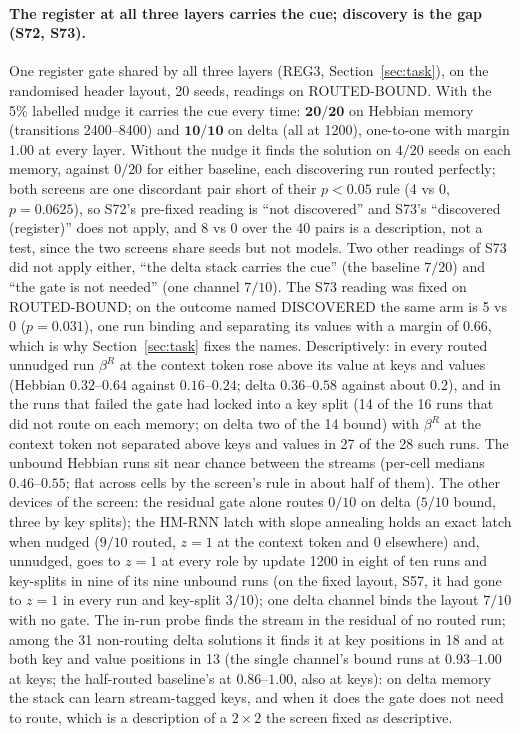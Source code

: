 \documentclass[11pt]{article}
\begin{document}
\paragraph{The register at all three layers carries the cue; discovery is the gap (S72, S73).} One register gate shared by all three layers (REG3, Section~\ref{sec:task}), on the randomised header layout, 20 seeds, readings on ROUTED-BOUND. With the 5\% labelled nudge it carries the cue every time: $\mathbf{20/20}$ on Hebbian memory (transitions 2400--8400) and $\mathbf{10/10}$ on delta (all at 1200), one-to-one with margin $1.00$ at every layer. Without the nudge it finds the solution on $4/20$ seeds on each memory, against $0/20$ for either baseline, each discovering run routed perfectly; both screens are one discordant pair short of their $p < 0.05$ rule (4 vs 0, $p = 0.0625$), so S72's pre-fixed reading is ``not discovered'' and S73's ``discovered (register)'' does not apply, and 8 vs 0 over the 40 pairs is a description, not a test, since the two screens share seeds but not models. Two other readings of S73 did not apply either, ``the delta stack carries the cue'' (the baseline $7/20$) and ``the gate is not needed'' (one channel $7/10$). The S73 reading was fixed on ROUTED-BOUND; on the outcome named DISCOVERED the same arm is 5 vs 0 ($p = 0.031$), one run binding and separating its values with a margin of $0.66$, which is why Section~\ref{sec:task} fixes the names. Descriptively: in every routed unnudged run $\beta^R$ at the context token rose above its value at keys and values (Hebbian $0.32$--$0.64$ against $0.16$--$0.24$; delta $0.36$--$0.58$ against about $0.2$), and in the runs that failed the gate had locked into a key split (14 of the 16 runs that did not route on each memory; on delta two of the 14 bound) with $\beta^R$ at the context token not separated above keys and values in 27 of the 28 such runs. The unbound Hebbian runs sit near chance between the streams (per-cell medians $0.46$--$0.55$; flat across cells by the screen's rule in about half of them). The other devices of the screen: the residual gate alone routes $0/10$ on delta ($5/10$ bound, three by key splits); the HM-RNN latch with slope annealing holds an exact latch when nudged ($9/10$ routed, $z = 1$ at the context token and $0$ elsewhere) and, unnudged, goes to $z = 1$ at every role by update 1200 in eight of ten runs and key-splits in nine of its nine unbound runs (on the fixed layout, S57, it had gone to $z = 1$ in every run and key-split $3/10$); one delta channel binds the layout $7/10$ with no gate. The in-run probe finds the stream in the residual of no routed run; among the 31 non-routing delta solutions it finds it at key positions in 18 and at both key and value positions in 13 (the single channel's bound runs at $0.93$--$1.00$ at keys; the half-routed baseline's at $0.86$--$1.00$, also at keys): on delta memory the stack can learn stream-tagged keys, and when it does the gate does not need to route, which is a description of a $2\times2$ the screen fixed as descriptive.
\end{document}
